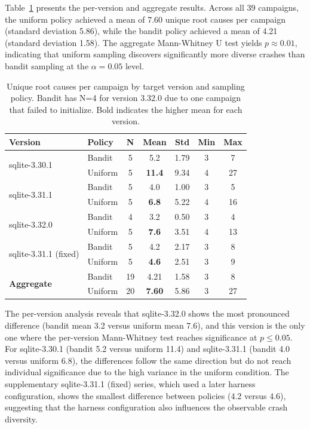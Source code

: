 Table~\ref{tab:rq1} presents the per-version and aggregate results. Across all 39 campaigns, the uniform policy achieved a mean of 7.60 unique root causes per campaign (standard deviation 5.86), while the bandit policy achieved a mean of 4.21 (standard deviation 1.58). The aggregate Mann-Whitney U test yields $p \approx 0.01$, indicating that uniform sampling discovers significantly more diverse crashes than bandit sampling at the $\alpha = 0.05$ level.

\begin{table}[htbp]
\caption{Unique root causes per campaign by target version and sampling policy. Bandit has N=4 for version 3.32.0 due to one campaign that failed to initialize. Bold indicates the higher mean for each version.}
\label{tab:rq1}
\centering
\begin{tabular}{llccccc}
\toprule
\textbf{Version} & \textbf{Policy} & \textbf{N} & \textbf{Mean} & \textbf{Std} & \textbf{Min} & \textbf{Max} \\
\midrule
\multirow{2}{*}{sqlite-3.30.1} & Bandit & 5 & 5.2 & 1.79 & 3 & 7 \\
                                & Uniform & 5 & \textbf{11.4} & 9.34 & 4 & 27 \\
\midrule
\multirow{2}{*}{sqlite-3.31.1} & Bandit & 5 & 4.0 & 1.00 & 3 & 5 \\
                                & Uniform & 5 & \textbf{6.8} & 5.22 & 4 & 16 \\
\midrule
\multirow{2}{*}{sqlite-3.32.0} & Bandit & 4 & 3.2 & 0.50 & 3 & 4 \\
                                & Uniform & 5 & \textbf{7.6} & 3.51 & 4 & 13 \\
\midrule
\multirow{2}{*}{sqlite-3.31.1 (fixed)} & Bandit & 5 & 4.2 & 2.17 & 3 & 8 \\
                                        & Uniform & 5 & \textbf{4.6} & 2.51 & 3 & 9 \\
\midrule
\multirow{2}{*}{\textbf{Aggregate}} & Bandit & 19 & 4.21 & 1.58 & 3 & 8 \\
                                     & Uniform & 20 & \textbf{7.60} & 5.86 & 3 & 27 \\
\bottomrule
\end{tabular}
\end{table}

The per-version analysis reveals that sqlite-3.32.0 shows the most pronounced difference (bandit mean 3.2 versus uniform mean 7.6), and this version is the only one where the per-version Mann-Whitney test reaches significance at $p \leq 0.05$. For sqlite-3.30.1 (bandit 5.2 versus uniform 11.4) and sqlite-3.31.1 (bandit 4.0 versus uniform 6.8), the differences follow the same direction but do not reach individual significance due to the high variance in the uniform condition. The supplementary sqlite-3.31.1 (fixed) series, which used a later harness configuration, shows the smallest difference between policies (4.2 versus 4.6), suggesting that the harness configuration also influences the observable crash diversity.


